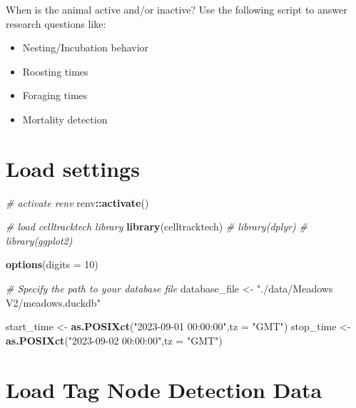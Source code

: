 \documentclass[
]{book}
\newenvironment{Shaded}{\begin{snugshade}}{\end{snugshade}}
\newcommand{\AttributeTok}[1]{\textcolor[rgb]{0.13,0.29,0.53}{#1}}
\newcommand{\CommentTok}[1]{\textcolor[rgb]{0.56,0.35,0.01}{\textit{#1}}}
\newcommand{\DecValTok}[1]{\textcolor[rgb]{0.00,0.00,0.81}{#1}}
\newcommand{\FunctionTok}[1]{\textcolor[rgb]{0.13,0.29,0.53}{\textbf{#1}}}
\newcommand{\NormalTok}[1]{#1}
\newcommand{\OtherTok}[1]{\textcolor[rgb]{0.56,0.35,0.01}{#1}}
\newcommand{\SpecialCharTok}[1]{\textcolor[rgb]{0.81,0.36,0.00}{\textbf{#1}}}
\newcommand{\StringTok}[1]{\textcolor[rgb]{0.31,0.60,0.02}{#1}}
\providecommand{\tightlist}{%
  \setlength{\itemsep}{0pt}\setlength{\parskip}{0pt}}
\begin{document}
When is the animal active and/or inactive? Use the following script to answer research questions like:

\begin{itemize}
\tightlist
\item
  Nesting/Incubation behavior
\item
  Roosting times
\item
  Foraging times
\item
  Mortality detection
\end{itemize}

\section{Load settings}\label{load-settings-1}

\begin{Shaded}
\begin{Highlighting}[]
\CommentTok{\# activate renv}
\NormalTok{renv}\SpecialCharTok{::}\FunctionTok{activate}\NormalTok{()}
\end{Highlighting}
\end{Shaded}

\begin{Shaded}
\begin{Highlighting}[]
\CommentTok{\# load celltracktech library}
\FunctionTok{library}\NormalTok{(celltracktech)}
\CommentTok{\# library(dplyr)}
\CommentTok{\# library(ggplot2)}

\FunctionTok{options}\NormalTok{(}\AttributeTok{digits =} \DecValTok{10}\NormalTok{)}

\CommentTok{\# Specify the path to your database file}
\NormalTok{database\_file }\OtherTok{\textless{}{-}} \StringTok{"./data/Meadows V2/meadows.duckdb"}

\NormalTok{start\_time }\OtherTok{\textless{}{-}} \FunctionTok{as.POSIXct}\NormalTok{(}\StringTok{"2023{-}09{-}01 00:00:00"}\NormalTok{,}\AttributeTok{tz =} \StringTok{"GMT"}\NormalTok{)}
\NormalTok{stop\_time }\OtherTok{\textless{}{-}} \FunctionTok{as.POSIXct}\NormalTok{(}\StringTok{"2023{-}09{-}02 00:00:00"}\NormalTok{,}\AttributeTok{tz =} \StringTok{"GMT"}\NormalTok{)}
\end{Highlighting}
\end{Shaded}

\section{Load Tag Node Detection Data}\label{load-tag-node-detection-data}
\end{document}

